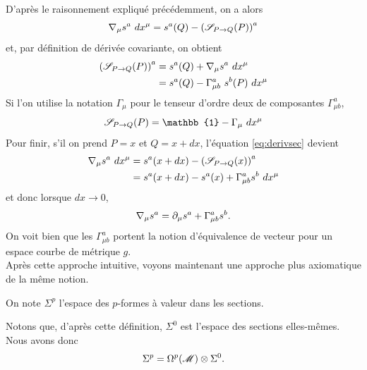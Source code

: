 \documentclass[a4paper,11pt]{report}
\begin{document}
                 D'après le raisonnement expliqué précédemment, on a alors
                 \begin{equation}\label{eq:derivsec}
                     \nabla_\mu s^a~dx^\mu = s^a(Q)-\left(\S_{P\to Q}(P)\right)^a
                 \end{equation}
                 et, par définition de dérivée covariante, on obtient
                 \begin{align}
                     \left(\S_{P\to Q}(P)\right)^a &= s^a(Q) + \nabla_\mu s^a~dx^\mu\\
                     &= s^a(Q) - \Gamma^a_{\mu b}~ s^b(P) ~dx^\mu
                 \end{align}
                 Si l'on utilise la notation $\Gamma_\mu$ pour le tenseur d'ordre deux de composantes $\Gamma^a_{\mu b}$, 
                 \begin{equation}
                     \S_{P\to Q}(P) = \mathbb{1} - \Gamma_\mu~dx^\mu
                 \end{equation}
                 Pour finir, s'il on prend $P = x$ et $Q = x+dx$, l'équation \ref{eq:derivsec} devient
                 \begin{align}
                      \nabla_\mu s^a~dx^\mu &= s^a(x+dx)-\left(\S_{P\to Q}(x)\right)^a\\
                      &= s^a(x+dx)-s^a(x)+\Gamma^a_{\mu b}s^b~dx^\mu
                 \end{align}
                 et donc lorsque $dx\to0$,
                 \begin{equation}
                     \nabla_\mu s^a = \p_\mu s^a+\Gamma^a_{\mu b}s^b.
                 \end{equation}
                 On voit bien que les $\Gamma^a_{\mu b}$ portent la notion d'équivalence de vecteur pour un espace courbe de métrique $g$. \\
                 
                 Après cette approche intuitive, voyons maintenant une approche plus axiomatique de la même notion.
                 
                 \begin{defn}
                    On note $\Sigma^p$ l'espace des $p$-formes à valeur dans les sections.
                 \end{defn}
                 
                 Notons que, d'après cette définition, $\Sigma^0$ est l'espace des sections elles-mêmes. Nous avons donc
                 \begin{equation}
                    \Sigma^p = \Omega^p(\M)\otimes\Sigma^0.
                \end{equation}
                
\end{document}
